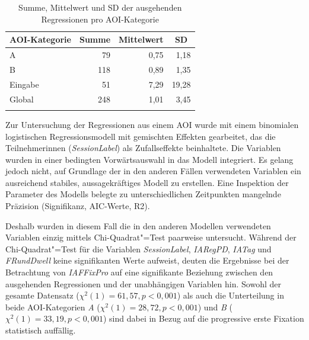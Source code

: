 


\begin{table}
    \begin{tabular}{lrrr}
    \lsptoprule
        {AOI-Kategorie} & \multicolumn{1}{c}{Summe} & \multicolumn{1}{c}{Mittelwert} & \multicolumn{1}{c}{SD} \\ 
        \midrule
        A  &  79 & 0,75 & 1,18 \\ 
        B &  118 & 0,89 & 1,35 \\ 
        Eingabe  &  51 & 7,29 & 19,28 \\\midrule
        Global &  248 & 1,01 & 3,45 \\ 
        \lspbottomrule
    \end{tabular}
    \caption{Summe, Mittelwert und SD der ausgehenden Regressionen pro AOI-Kategorie\label{K6:tab:DeDe:mean-sd-regout}}
\end{table}

Zur Untersuchung der Regressionen aus einem AOI wurde mit einem binomialen logistischen Regressionsmodell mit gemischten Effekten gearbeitet, das die Teilnehmer{\textperiodcentered}innen (\emph{SessionLabel}) als Zufallseffekte beinhaltete. Die Variablen wurden in einer bedingten Vorwärtsauswahl in das Modell integriert. Es gelang jedoch nicht, auf Grundlage der in den anderen Fällen verwendeten Variablen ein ausreichend stabiles, aussagekräftiges Modell zu erstellen. Eine Inspektion der Parameter des Modells belegte zu unterschiedlichen Zeitpunkten mangelnde Präzision (Signifikanz, AIC-Werte, R2).

Deshalb wurden in diesem Fall die in den anderen Modellen verwendeten Variablen einzig mittels Chi-Quadrat"=Test paarweise untersucht. Während der Chi-Quadrat"=Test für die Variablen \emph{SessionLabel}, \emph{IARegPD}, \emph{IATag} und \emph{FRundDwell} keine signifikanten Werte aufweist, deuten die Ergebnisse bei der Betrachtung von \emph{IAFFixPro} auf eine signifikante Beziehung zwischen den ausgehenden Regressionen und der unabhängigen Variablen hin. Sowohl der gesamte Datensatz ($\chi^2(1) = 61,57, p < 0,001$) als auch die Unterteilung in beide AOI-Kategorien \emph{A} ($\chi^2(1) = 28,72, p < 0,001$) und \emph{B} ($\chi^2(1) = 33,19, p < 0,001$) sind dabei in Bezug auf die progressive erste Fixation statistisch auffällig.

